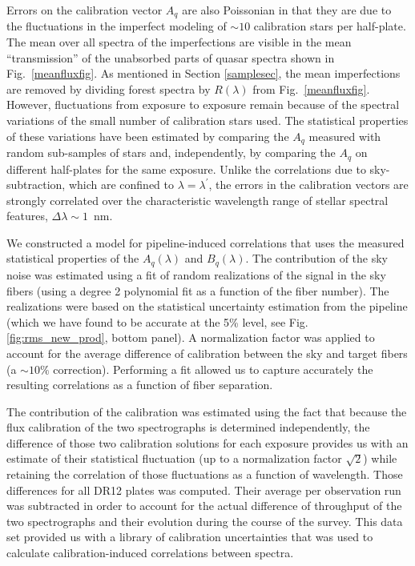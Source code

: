 \documentclass{aa}
\begin{document}
Errors on the calibration vector $A_q$ are also Poissonian in that
they are due to the fluctuations in the imperfect modeling of $\sim10$
calibration stars per half-plate.
The mean over all spectra
of the imperfections are visible in the mean ``transmission''
of the unabsorbed parts of quasar spectra shown in Fig.~\ref{meanfluxfig}.
As mentioned  in Section \ref{samplesec},  
the mean imperfections are removed by dividing
forest spectra by $R(\lambda)$ from Fig.~\ref{meanfluxfig}.
However, fluctuations from exposure
to exposure remain because of the spectral variations of 
the small number of calibration stars used.
The statistical properties of these variations have been estimated
by comparing the $A_q$ measured with random sub-samples of stars
and, independently,
by comparing the $A_q$ on different half-plates for the same exposure.
Unlike the correlations due to sky-subtraction, which are confined
to $\lambda=\lambda^\prime$, the errors in the calibration vectors
are strongly correlated
over the characteristic wavelength range of stellar
spectral features, $\Delta\lambda\sim1$~nm.



We constructed a model for pipeline-induced correlations that uses the
measured statistical properties of the $A_q(\lambda)$ and $B_q(\lambda)$.
The contribution of
the sky  noise was estimated using a fit of random realizations of
the signal in the sky fibers (using a degree 2 polynomial fit as a
function of the fiber number).
The realizations were based on the  statistical uncertainty
estimation  from the pipeline (which we have found to be accurate at
the 5\% level, see Fig. \ref{fig:rms_new_prod}, bottom panel).
A normalization
factor was applied to account for the average difference of calibration between
the sky and target fibers (a $\sim10\%$ correction).
Performing a
fit allowed us to capture accurately the resulting correlations as a
function of fiber separation.

The contribution of the calibration was estimated using the fact that
because the flux calibration of the two spectrographs is determined
independently, the difference of those two calibration solutions
for each exposure provides us with an estimate of their statistical
fluctuation (up to a normalization factor $\sqrt{2}$) while retaining
the correlation of those fluctuations as a function of wavelength.
Those differences for all DR12 plates was computed. Their average
per observation run was subtracted in order to account for the actual
difference of throughput of the two spectrographs and their evolution
during the course of the survey. This data set provided us with a
library of calibration uncertainties that was used to calculate
calibration-induced correlations between spectra.
\end{document}
